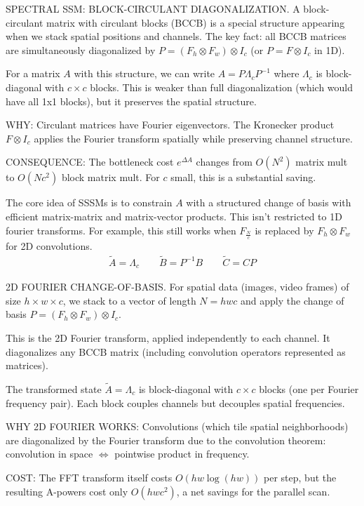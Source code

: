\documentclass{article}
\begin{document}
\begin{thomasbox}
SPECTRAL SSM: BLOCK-CIRCULANT DIAGONALIZATION. A block-circulant matrix with circulant blocks (BCCB) is a special structure appearing when we stack spatial positions and channels. The key fact: all BCCB matrices are simultaneously diagonalized by $P = (F_h \otimes F_w) \otimes I_c$ (or $P = F \otimes I_c$ in 1D).

For a matrix $A$ with this structure, we can write $A = P \Lambda_c P^{-1}$ where $\Lambda_c$ is block-diagonal with $c \times c$ blocks. This is weaker than full diagonalization (which would have all 1x1 blocks), but it preserves the spatial structure.

WHY: Circulant matrices have Fourier eigenvectors. The Kronecker product $F \otimes I_c$ applies the Fourier transform spatially while preserving channel structure.

CONSEQUENCE: The bottleneck cost $e^{\Delta A}$ changes from $O(N^2)$ matrix mult to $O(Nc^2)$ block matrix mult. For $c$ small, this is a substantial saving.
\end{thomasbox}

The core idea of SSSMs is to constrain $A$ with a structured change of basis with efficient matrix-matrix and matrix-vector products. This isn't restricted to 1D fourier transforms. For example, this still works when $F_{\frac{N}{c}}$ is replaced by $F_h \otimes F_w$ for 2D convolutions.
%
\begin{align}
\label{eq:ssm:spectral}
\widetilde{A} = \Lambda_c \qquad \widetilde{B} = P^{-1} B \qquad \widetilde{C} = C P
\end{align}

\begin{thomasbox}
2D FOURIER CHANGE-OF-BASIS. For spatial data (images, video frames) of size $h \times w \times c$, we stack to a vector of length $N = hwc$ and apply the change of basis $P = (F_h \otimes F_w) \otimes I_c$.

This is the 2D Fourier transform, applied independently to each channel. It diagonalizes any BCCB matrix (including convolution operators represented as matrices).

The transformed state $\widetilde{A} = \Lambda_c$ is block-diagonal with $c \times c$ blocks (one per Fourier frequency pair). Each block couples channels but decouples spatial frequencies.

WHY 2D FOURIER WORKS: Convolutions (which tile spatial neighborhoods) are diagonalized by the Fourier transform due to the convolution theorem: convolution in space $\Leftrightarrow$ pointwise product in frequency.

COST: The FFT transform itself costs $O(hw \log(hw))$ per step, but the resulting A-powers cost only $O(hwc^2)$, a net savings for the parallel scan.
\end{thomasbox}
\end{document}
